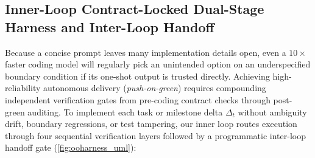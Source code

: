 \documentclass[11pt,a4paper,copyright]{google}
\begin{document}
\subsection{Inner-Loop Contract-Locked Dual-Stage Harness and Inter-Loop Handoff}
\label{subsec:inner_harness}

Because a concise prompt leaves many implementation details open, even a $10\times$ faster coding model will regularly pick an unintended option on an underspecified boundary condition if its one-shot output is trusted directly. Achieving high-reliability autonomous delivery (\emph{push-on-green}) requires compounding independent verification gates from pre-coding contract checks through post-green auditing. To implement each task or milestone delta $\Delta_t$ without ambiguity drift, boundary regressions, or test tampering, our inner loop routes execution through four sequential verification layers followed by a programmatic inter-loop handoff gate (\cref{fig:ooharness_uml}):
\end{document}
